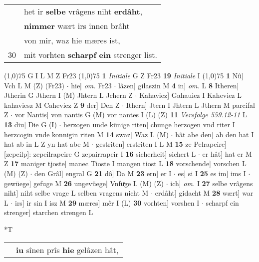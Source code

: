 \documentclass[8pt,a4paper,notitlepage]{article}
\begin{document}
\begin{table}[ht]
\begin{minipage}[t]{0.5\linewidth}
\begin{tabular}{rl}
 & het ir \textbf{selbe} vrâgens niht \textbf{erdâht},\\ 
 & \textbf{nimmer} wært irs innen brâht\\ 
 & von mir, waz hie mæres ist,\\ 
30 & mit vorhten \textbf{scharpf} \textbf{ein} strenger list.\\ 
\end{tabular}
\scriptsize
\line(1,0){75} \newline
G I L M Z Fr23 \newline
\line(1,0){75} \newline
\textbf{1} \textit{Initiale} G Z Fr23  \textbf{19} \textit{Initiale} I  \newline
\line(1,0){75} \newline
\textbf{1} Nû] Vch L M (Z) (Fr23)  $\cdot$ hie] \textit{om.} Fr23  $\cdot$ lâzen] gilaszin M \textbf{4} in] \textit{om.} L \textbf{8} Itheren] Jtherin G Jthern I (M) Jhtern L Jchern Z  $\cdot$ Kahaviez] Gahauiez I Kaheviez L kahaviesz M Caheviez Z \textbf{9} der] Den Z  $\cdot$ Ithern] Jtern I Jhtern L Jthern M parcifal Z  $\cdot$ vor Nantis] von nantis G (M) vor nantes I (L) (Z) \textbf{11} \textit{Versfolge 559.12-11} L  \textbf{13} diu] Die G (I)  $\cdot$ herzogen unde künige riten] chunge herzogen vnd riter I herzcogin vnde konnigin riten M \textbf{14} swaz] Waz L (M)  $\cdot$ hât abe den] ab den hat I hat ab in L Z yn hat abe M  $\cdot$ gestriten] erstriten I L M \textbf{15} ze Pelrapeire] [zepeilp]: zepeilrapeire G zepairrapeir I \textbf{16} sicherheit] sichert L  $\cdot$ er hât] hat er M Z \textbf{17} maniger tjoste] manec Tioste I mangen tiost L \textbf{18} vorschende] vorschen L (M) (Z)  $\cdot$ den Grâl] engral G \textbf{21} dô] Da M \textbf{23} ern] er I  $\cdot$ es] si I \textbf{25} es im] ims I  $\cdot$ gewüege] gefuge M \textbf{26} ungevüege] Vnfuͯge L (M) (Z)  $\cdot$ ich] \textit{om.} I \textbf{27} selbe vrâgens niht] niht selbe vrage L selben vragens nicht M  $\cdot$ erdâht] gidacht M \textbf{28} wært] war L  $\cdot$ irs] ir sin I isz M \textbf{29} mæres] mêr I (L) \textbf{30} vorhten] vorshen I  $\cdot$ scharpf ein strenger] starchen strengen L \newline
\end{minipage}
\hspace{0.5cm}
\begin{minipage}[t]{0.5\linewidth}
\small
\begin{center}*T
\end{center}
\begin{tabular}{rl}
 & \textbf{iu} sînen prîs \textbf{hie} gelâzen hât,\\ 

\end{tabular}
\end{minipage}
\end{table}
\end{document}
